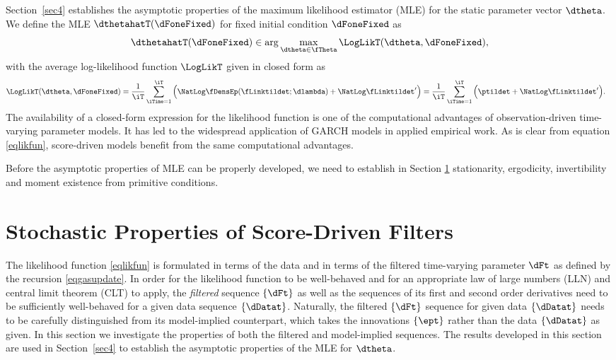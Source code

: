Section~\ref{sec4} establishes the asymptotic properties of the maximum likelihood estimator (MLE) for the static parameter vector $\dtheta$. We define the MLE $\dthetahatT(\dFoneFixed)$  for fixed initial condition $\dFoneFixed$ as
\begin{equation*}
    \dthetahatT(\dFoneFixed) \in \arg\max_{\dtheta \in \fTheta} \LogLikT(\dtheta,\dFoneFixed),
\end{equation*}
with the average log-likelihood function $\LogLikT$ given in closed form as
\begin{equation}
    \label{eqlikfun}
    \begin{split}
        \LogLikT(\dtheta,\dFoneFixed) &  =  
    \frac{1}{\iT}
    \sum_{\iTime=1}^{\iT} \Big( \NatLog \fDensEp(\fLinktildet; \dlambda) + 
    \NatLog \fLinktildet' \Big) = 
    \frac{1}{\iT}\sum_{\iTime=1}^{\iT}  \Big( \ptildet +  \NatLog \fLinktildet' \Big).
    \end{split}
\end{equation}
The availability of a closed-form expression for the likelihood function is one of the computational advantages of observation-driven time-varying parameter models. It has led to the widespread application of GARCH models in applied empirical work.
As is clear from equation \eqref{eqlikfun}, score-driven models benefit from the same computational advantages.

Before the asymptotic properties of MLE can be properly developed, we need to establish in Section \ref{sec3} stationarity, ergodicity, invertibility and moment existence from primitive conditions.



\section{Stochastic Properties of Score-Driven Filters} %
\label{sec3}

The likelihood function \eqref{eqlikfun} is formulated in terms of the data and in terms of the filtered time-varying parameter $\dFt$ as defined by the recursion \eqref{eqgasupdate}. 
In order for the likelihood function  to be well-behaved and for an appropriate law of large numbers (LLN) and central limit theorem (CLT) to apply, the \emph{filtered} sequence $\{\dFt\}$ as well as the sequences of its first and second order derivatives need to be sufficiently well-behaved for a given data sequence $\{\dDatat\}$. 
Naturally, the filtered $\{\dFt\}$ sequence for given data $\{\dDatat\}$ needs to be carefully distinguished from its model-implied counterpart, which takes the innovations $\{\ept\}$ rather than the data $\{\dDatat\}$ as given.
In this section we investigate the properties of both the filtered and model-implied sequences. The results developed in this section are used in Section~\ref{sec4} to establish the asymptotic properties of the MLE for $\dtheta$.%


